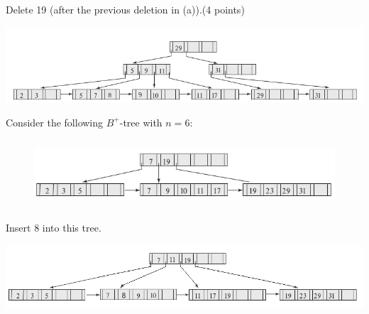 \documentclass[a4 paper]{article}
\begin{document}
 Delete 19 (after the previous deletion in (a)).\indent \indent (4 points)

{\centering \includegraphics[width=\textwidth/2]{tree-delete - Copy (2) - Copy.png}}

Consider the following $B^{+}$-tree with $n = 6$:
\begin{figure}[h]
\includegraphics[height=1in, width=5in]{tree-insert.png}
\end{figure}
Insert 8 into this tree.

{\centering \includegraphics[width=\textwidth/2]{tree-insert - Copy (2).png}}
\end{document}
